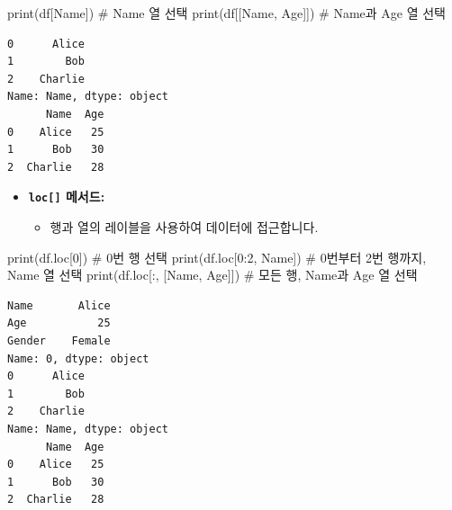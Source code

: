 \documentclass[
  letterpaper,
]{book}
\newenvironment{Shaded}{\begin{snugshade}}{\end{snugshade}}
\newcommand{\BuiltInTok}[1]{\textcolor[rgb]{0.00,0.23,0.31}{#1}}
\newcommand{\CommentTok}[1]{\textcolor[rgb]{0.37,0.37,0.37}{#1}}
\newcommand{\DecValTok}[1]{\textcolor[rgb]{0.68,0.00,0.00}{#1}}
\newcommand{\NormalTok}[1]{\textcolor[rgb]{0.00,0.23,0.31}{#1}}
\newcommand{\StringTok}[1]{\textcolor[rgb]{0.13,0.47,0.30}{#1}}
\providecommand{\tightlist}{%
  \setlength{\itemsep}{0pt}\setlength{\parskip}{0pt}}
\begin{document}
\begin{Shaded}
\begin{Highlighting}[]
    \BuiltInTok{print}\NormalTok{(df[}\StringTok{\textquotesingle{}Name\textquotesingle{}}\NormalTok{]) }\CommentTok{\# \textquotesingle{}Name\textquotesingle{} 열 선택}
    \BuiltInTok{print}\NormalTok{(df[[}\StringTok{\textquotesingle{}Name\textquotesingle{}}\NormalTok{, }\StringTok{\textquotesingle{}Age\textquotesingle{}}\NormalTok{]]) }\CommentTok{\# \textquotesingle{}Name\textquotesingle{}과 \textquotesingle{}Age\textquotesingle{} 열 선택}
\end{Highlighting}
\end{Shaded}

\begin{verbatim}
0      Alice
1        Bob
2    Charlie
Name: Name, dtype: object
      Name  Age
0    Alice   25
1      Bob   30
2  Charlie   28
\end{verbatim}

\begin{itemize}
\item
  \textbf{\texttt{loc{[}{]}} 메서드:}

  \begin{itemize}
  \tightlist
  \item
    행과 열의 레이블을 사용하여 데이터에 접근합니다.
  \end{itemize}
\end{itemize}

\begin{Shaded}
\begin{Highlighting}[]
    \BuiltInTok{print}\NormalTok{(df.loc[}\DecValTok{0}\NormalTok{]) }\CommentTok{\# 0번 행 선택}
    \BuiltInTok{print}\NormalTok{(df.loc[}\DecValTok{0}\NormalTok{:}\DecValTok{2}\NormalTok{, }\StringTok{\textquotesingle{}Name\textquotesingle{}}\NormalTok{]) }\CommentTok{\# 0번부터 2번 행까지, \textquotesingle{}Name\textquotesingle{} 열 선택}
    \BuiltInTok{print}\NormalTok{(df.loc[:, [}\StringTok{\textquotesingle{}Name\textquotesingle{}}\NormalTok{, }\StringTok{\textquotesingle{}Age\textquotesingle{}}\NormalTok{]]) }\CommentTok{\# 모든 행, \textquotesingle{}Name\textquotesingle{}과 \textquotesingle{}Age\textquotesingle{} 열 선택}
\end{Highlighting}
\end{Shaded}

\begin{verbatim}
Name       Alice
Age           25
Gender    Female
Name: 0, dtype: object
0      Alice
1        Bob
2    Charlie
Name: Name, dtype: object
      Name  Age
0    Alice   25
1      Bob   30
2  Charlie   28
\end{verbatim}
\end{document}
